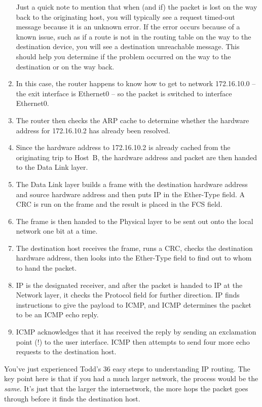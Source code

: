 \begin{enumerate}
   \begin{note}
   Just a quick note to mention that when (and if) the packet is lost on the way back to the originating host,
   you will typically see a request timed-out message because it is an unknown error.
   If the error occurs because of a known issue, such as if a route is not in the routing table on the way to the destination device,
   you will see a destination unreachable message.
   This should help you determine if the problem occurred on the way to the destination or on the way back.
   \end{note}
\item
   In this case, the router happens to know how to get to network 172.16.10.0 -- the exit interface is Ethernet0 -- so the packet is switched to interface Ethernet0.
\item
  The router then checks the ARP cache to determine whether the hardware
  address for 172.16.10.2 has already been resolved.
\item
  Since the hardware address to 172.16.10.2 is already cached from the
  originating trip to Host~B, the hardware address and packet are then
  handed to the Data Link layer.
\item
  The Data Link layer builds a frame with the destination hardware
  address and source hardware address and then puts IP in the Ether-Type
  field. A CRC is run on the frame and the result is placed in the FCS
  field.
\item
  The frame is then handed to the Physical layer to be sent out onto the
  local network one bit at a time.
\item
  The destination host receives the frame, runs a CRC, checks the
  destination hardware address, then looks into the Ether-Type field to
  find out to whom to hand the packet.
\item
  IP is the designated receiver, and after the packet is handed to IP at
  the Network layer, it checks the Protocol field for further direction.
  IP finds instructions to give the payload to ICMP, and ICMP determines
  the packet to be an ICMP echo reply.
\item
  ICMP acknowledges that it has received the reply by sending an
  exclamation point (!) to the user interface. ICMP then attempts to
  send four more echo requests to the destination host.
\end{enumerate}

You've just experienced Todd's 36 easy steps to understanding IP
routing. The key point here is that if you had a much larger network,
the process would be the \emph{same}. It's just that the larger the
internetwork, the more hops the packet goes through before it finds the
destination host.

